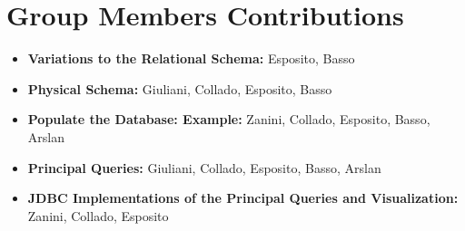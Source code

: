 \documentclass{article}
\begin{document}
\maketitle






\section{Group Members Contributions}
\begin{itemize}
	\item \textbf{Variations to the Relational Schema:} Esposito, Basso
	\item \textbf{Physical Schema:} Giuliani, Collado, Esposito, Basso
	\item \textbf{Populate the Database: Example:} Zanini, Collado, Esposito, Basso, Arslan
	\item \textbf{Principal Queries:} Giuliani, Collado, Esposito, Basso, Arslan
	\item \textbf{JDBC Implementations of the Principal Queries and Visualization:} Zanini, Collado, Esposito
\end{itemize}
\end{document}
